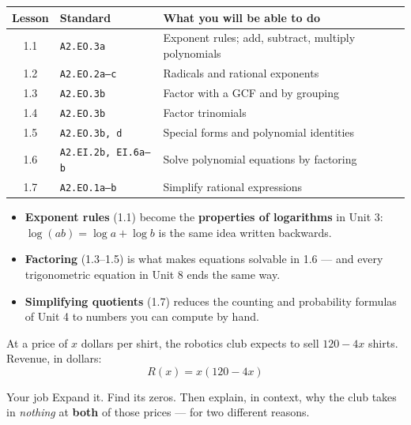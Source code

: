 \documentclass[aspectratio=169, 11pt]{beamer}
\begin{document}
\begin{frame}[t, plain]
  \renewcommand{\arraystretch}{1.25}
  \small
  \begin{tabularx}{\textwidth}{@{}c p{2.7cm} X@{}}
    \textbf{Lesson} & \textbf{Standard} & \textbf{What you will be able to do} \\
    \hline
    1.1 & \texttt{A2.EO.3a}    & Exponent rules; add, subtract, multiply polynomials \\
    1.2 & \texttt{A2.EO.2a--c} & Radicals and rational exponents \\
    1.3 & \texttt{A2.EO.3b}    & Factor with a GCF and by grouping \\
    1.4 & \texttt{A2.EO.3b}    & Factor trinomials \\
    1.5 & \texttt{A2.EO.3b, d} & Special forms and polynomial identities \\
    1.6 & \texttt{A2.EI.2b, EI.6a--b} & Solve polynomial equations by factoring \\
    1.7 & \texttt{A2.EO.1a--b} & Simplify rational expressions \\
  \end{tabularx}
\end{frame}

\begin{frame}[t, plain]
  \begin{itemize}
    \setlength{\itemsep}{0.4cm}
    \item \textbf{Exponent rules} (1.1) become the \textbf{properties of logarithms} in Unit 3:
          $\log(ab)=\log a+\log b$ is the same idea written backwards.
    \item \textbf{Factoring} (1.3--1.5) is what makes equations solvable in 1.6 --- and every
          trigonometric equation in Unit 8 ends the same way.
    \item \textbf{Simplifying quotients} (1.7) reduces the counting and probability formulas of
          Unit 4 to numbers you can compute by hand.
  \end{itemize}
\end{frame}

\begin{frame}[t, plain]
  At a price of $x$ dollars per shirt, the robotics club expects to sell $120-4x$ shirts.
  Revenue, in dollars:
  \[ R(x) = x(120-4x) \]
  \begin{block}{Your job}
    Expand it. Find its zeros. Then explain, in context, why the club takes in \emph{nothing} at
    \textbf{both} of those prices --- for two different reasons.
  \end{block}
\end{frame}
\end{document}
